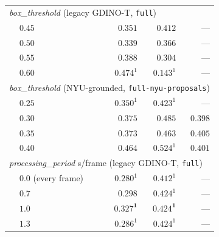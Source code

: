 \begin{table}[t]
\begin{tabular}{l l r r r}
\midrule
\multicolumn{5}{l}{\emph{box\_threshold} (legacy GDINO-T, \texttt{full})} \\
& $\mathbf{0.45}$  & $\mathbf{0.351}$ & $\mathbf{0.412}$ & --- \\
& $0.50$           & $0.339$ & $0.366$ & --- \\
& $0.55$           & $0.388$ & $0.304$ & --- \\
& $0.60$           & $0.474^{1}$ & $0.143^{1}$ & --- \\
\midrule
\multicolumn{5}{l}{\emph{box\_threshold} (NYU-grounded, \texttt{full-nyu-proposals})} \\
& $0.25$           & $0.350^{1}$ & $0.423^{1}$ & --- \\
& $\mathbf{0.30}$  & $\mathbf{0.375}$ & $\mathbf{0.485}$ & $\mathbf{0.398}$ \\
& $0.35$           & $0.373$ & $0.463$ & $0.405$ \\
& $0.40$           & $0.464$ & $0.524^{1}$ & $0.401$ \\
\midrule
\multicolumn{5}{l}{\emph{processing\_period} s/frame (legacy GDINO-T, \texttt{full})} \\
& $0.0$ (every frame) & $0.280^{1}$ & $0.412^{1}$ & --- \\
& $0.7$               & $0.298$     & $0.424^{1}$ & --- \\
& $\mathbf{1.0}$      & $\mathbf{0.327^{1}}$ & $\mathbf{0.424^{1}}$ & --- \\
& $1.3$               & $0.286^{1}$ & $0.424^{1}$ & --- \\
\bottomrule
\end{tabular}
\end{table}
